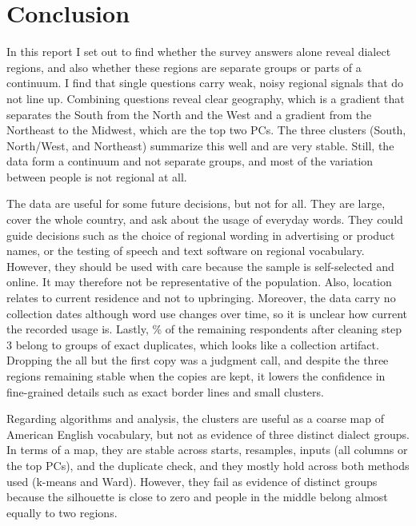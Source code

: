 \documentclass[10pt,letterpaper]{article}
\begin{document}
\section{Conclusion}\label{conclusion}

In this report I set out to find whether the survey answers alone reveal dialect regions, and also whether these regions are separate groups or parts of a continuum. I find that single questions carry weak, noisy regional signals that do not line up. Combining questions reveal clear geography, which is a gradient that separates the South from the North and the West and a gradient from the Northeast to the Midwest, which are the top two PCs. The three clusters (South, North/West, and Northeast) summarize this well and are very stable. Still, the data form a continuum and not separate groups, and most of the variation between people is not regional at all.

The data are useful for some future decisions, but not for all. They are large, cover the whole country, and ask about the usage of everyday words. They could guide decisions such as the choice of regional wording in advertising or product names, or the testing of speech and text software on regional vocabulary. However, they should be used with care because the sample is self-selected and online. It may therefore not be representative of the population. Also, location relates to current residence and not to upbringing. Moreover, the data carry no collection dates although word use changes over time, so it is unclear how current the recorded usage is. Lastly, \stPctInDupGroup\% of the remaining respondents after cleaning step 3 belong to groups of exact duplicates, which looks like a collection artifact. Dropping the all but the first copy was a judgment call, and despite the three regions remaining stable when the copies are kept, it lowers the confidence in fine-grained details such as exact border lines and small clusters.

Regarding algorithms and analysis, the clusters are useful as a coarse map of American English vocabulary, but not as evidence of three distinct dialect groups. In terms of a map, they are stable across starts, resamples, inputs (all columns or the top PCs), and the duplicate check, and they mostly hold across both methods used (k-means and Ward). However, they fail as evidence of distinct groups because the silhouette is close to zero and people in the middle belong almost equally to two regions.
\end{document}
